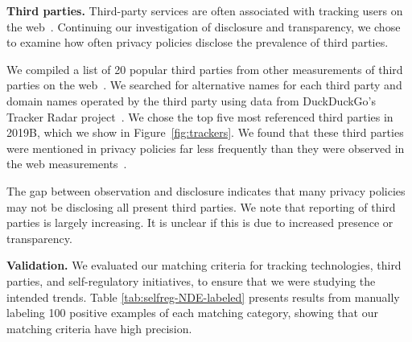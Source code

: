 \textbf{Third parties.} Third-party services are often associated with tracking users on the web~\cite{englehardt2016online}. Continuing our investigation of disclosure and transparency, we chose to examine how often privacy policies disclose the prevalence of third parties.

We compiled a list of 20 popular third parties from other measurements of third parties on the web~\cite{trackerradar, englehardt2016online,lerner2016internet}. We searched for alternative names for each third party and domain names operated by the third party using data from DuckDuckGo's Tracker Radar project~\cite{trackerradar}. We chose the top five most referenced third parties in 2019B, which we show in Figure~\ref{fig:trackers}. We found that these third parties were mentioned in privacy policies far less frequently than they were observed in the web measurements~\cite{trackerradar,englehardt2016online}. 

The gap between observation and disclosure indicates that many privacy policies may not be disclosing all present third parties. 
We note that reporting of third parties is largely increasing. It is unclear if this is due to increased presence or transparency.

\textbf{Validation.} We evaluated our matching criteria for tracking technologies, third parties, and self-regulatory initiatives, to ensure that we were studying the intended trends. Table \ref{tab:selfreg-NDE-labeled} presents results from manually labeling 100 positive examples of each matching category, showing that our matching criteria have high precision.

{
\begin{table}[]
\centering
{}
\caption{Manual validation of 100 positives for each query. For third parties and tracking technologies, positives indicate the term is used in a context related to tracking. For self-regulatory initiatives, positives indicate a relationship with the initiative.}
\label{tab:selfreg-NDE-labeled}
\end{table}
}

